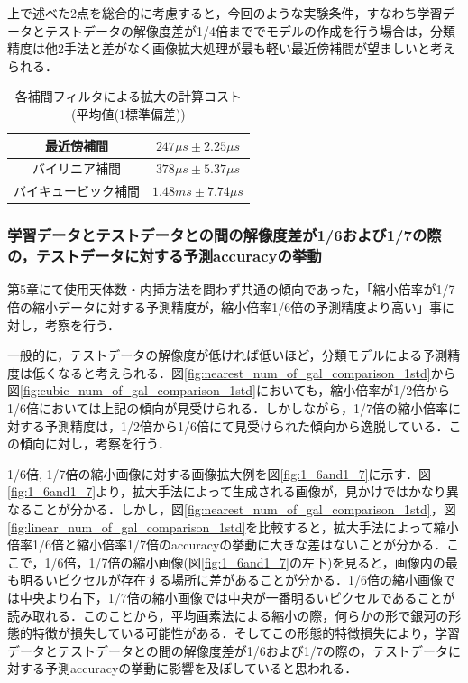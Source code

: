 \documentclass[a4j, 11pt]{jreport}
\begin{document}
上で述べた2点を総合的に考慮すると，今回のような実験条件，すなわち学習データとテストデータの解像度差が1/4倍まででモデルの作成を行う場合は，分類精度は他2手法と差がなく画像拡大処理が最も軽い最近傍補間が望ましいと考えられる．


\begin{table}[htbp]
  \centering
	\caption{各補間フィルタによる拡大の計算コスト(平均値(1標準偏差))}
  \begin{tabular}{|c|c|}
		\hline
    最近傍補間 & $247\mu s \pm 2.25\mu s$ \\ \hline
    バイリニア補間 & $378\mu s \pm 5.37\mu s$ \\ \hline
    バイキュービック補間 & $1.48ms \pm 7.74\mu s$ \\ \hline
  \end{tabular}
  \label{tb:calc_cost_by_interpolation}
\end{table}

\subsubsection{学習データとテストデータとの間の解像度差が1/6および1/7の際の，テストデータに対する予測accuracyの挙動}
第5章にて使用天体数・内挿方法を問わず共通の傾向であった，「縮小倍率が1/7倍の縮小データに対する予測精度が，縮小倍率1/6倍の予測精度より高い」事に対し，考察を行う．

一般的に，テストデータの解像度が低ければ低いほど，分類モデルによる予測精度は低くなると考えられる．図\ref{fig:nearest_num_of_gal_comparison_1std}から図\ref{fig:cubic_num_of_gal_comparison_1std}においても，縮小倍率が1/2倍から1/6倍においては上記の傾向が見受けられる．しかしながら，1/7倍の縮小倍率に対する予測精度は，1/2倍から1/6倍にて見受けられた傾向から逸脱している．この傾向に対し，考察を行う．

1/6倍, 1/7倍の縮小画像に対する画像拡大例を図\ref{fig:1_6and1_7}に示す．図\ref{fig:1_6and1_7}より，拡大手法によって生成される画像が，見かけではかなり異なることが分かる．しかし，図\ref{fig:nearest_num_of_gal_comparison_1std}，図\ref{fig:linear_num_of_gal_comparison_1std}を比較すると，拡大手法によって縮小倍率1/6倍と縮小倍率1/7倍のaccuracyの挙動に大きな差はないことが分かる．ここで，1/6倍，1/7倍の縮小画像(図\ref{fig:1_6and1_7}の左下)を見ると，画像内の最も明るいピクセルが存在する場所に差があることが分かる．1/6倍の縮小画像では中央より右下，1/7倍の縮小画像では中央が一番明るいピクセルであることが読み取れる．このことから，平均画素法による縮小の際，何らかの形で銀河の形態的特徴が損失している可能性がある．そしてこの形態的特徴損失により，学習データとテストデータとの間の解像度差が1/6および1/7の際の，テストデータに対する予測accuracyの挙動に影響を及ぼしていると思われる．
\end{document}
